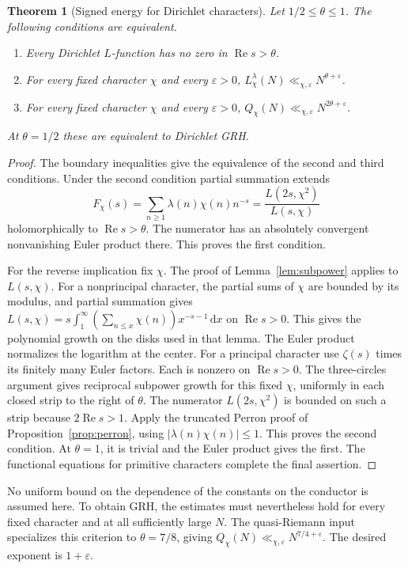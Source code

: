 \documentclass[11pt]{amsart}
\newtheorem{theorem}{Theorem}[section]
\theoremstyle{definition}
\theoremstyle{remark}
\newcommand{\R}{\operatorname{Re}}
\newcommand{\dd}{\,\mathrm d}
\numberwithin{equation}{section}
\begin{document}
\begin{theorem}[Signed energy for Dirichlet characters]\label{thm:char-grh}
Let \(1/2\le\theta\le1\). The following conditions are equivalent.
\begin{enumerate}
\item Every Dirichlet \(L\)-function has no zero in \(\R s>\theta\).
\item For every fixed character \(\chi\) and every \(\varepsilon>0\),
 \(L_\chi^\lambda(N)\ll_{\chi,\varepsilon}N^{\theta+\varepsilon}\).
\item For every fixed character \(\chi\) and every \(\varepsilon>0\),
 \(Q_\chi(N)\ll_{\chi,\varepsilon}N^{2\theta+\varepsilon}\).
\end{enumerate}
At \(\theta=1/2\) these are equivalent to Dirichlet GRH.
\end{theorem}
\begin{proof}
The boundary inequalities give the equivalence of the second and third conditions. Under the second condition partial summation extends
\[
 F_\chi(s)=\sum_{n\ge1}\lambda(n)\chi(n)n^{-s}
         =\frac{L(2s,\chi^2)}{L(s,\chi)}
\]
holomorphically to \(\R s>\theta\). The numerator has an absolutely convergent nonvanishing Euler product there. This proves the first condition.

For the reverse implication fix \(\chi\). The proof of Lemma~\ref{lem:subpower} applies to \(L(s,\chi)\). For a nonprincipal character, the partial sums of \(\chi\) are bounded by its modulus, and partial summation gives \(L(s,\chi)=s\int_1^\infty(\sum_{n\le x}\chi(n))x^{-s-1}\dd x\) on \(\R s>0\). This gives the polynomial growth on the disks used in that lemma. The Euler product normalizes the logarithm at the center. For a principal character use \(\zeta(s)\) times its finitely many Euler factors. Each is nonzero on \(\R s>0\). The three-circles argument gives reciprocal subpower growth for this fixed \(\chi\), uniformly in each closed strip to the right of \(\theta\). The numerator \(L(2s,\chi^2)\) is bounded on such a strip because \(2\R s>1\). Apply the truncated Perron proof of Proposition~\ref{prop:perron}, using \(|\lambda(n)\chi(n)|\le1\). This proves the second condition. At \(\theta=1\), it is trivial and the Euler product gives the first. The functional equations for primitive characters complete the final assertion.
\end{proof}

No uniform bound on the dependence of the constants on the conductor is assumed here. To obtain GRH, the estimates must nevertheless hold for every fixed character and at all sufficiently large \(N\). The quasi-Riemann input specializes this criterion to \(\theta=7/8\), giving \(Q_\chi(N)\ll_{\chi,\varepsilon}N^{7/4+\varepsilon}\). The desired exponent is \(1+\varepsilon\).
\end{document}
